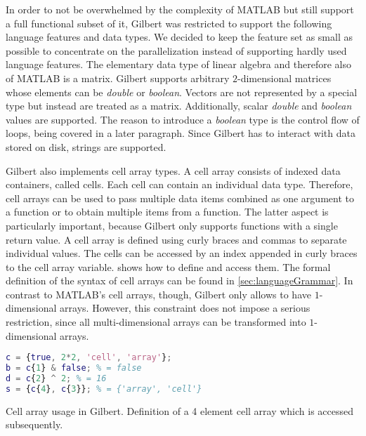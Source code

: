 In order to not be overwhelmed by the complexity of MATLAB but still support a full functional subset of it, Gilbert was restricted to support the following language features and data types.
We decided to keep the feature set as small as possible to concentrate on the parallelization instead of supporting hardly used language features.
The elementary data type of linear algebra and therefore also of MATLAB is a matrix.
Gilbert supports arbitrary $2$-dimensional matrices whose elements can be \emph{double} or \emph{boolean}.
Vectors are not represented by a special type but instead are treated as a matrix.
Additionally, scalar \emph{double} and \emph{boolean} values are supported.
The reason to introduce a \emph{boolean} type is the control flow of loops, being covered in a later paragraph.
Since Gilbert has to interact with data stored on disk, strings are supported.

Gilbert also implements cell array types.
A cell array consists of indexed data containers, called cells.
Each cell can contain an individual data type.
Therefore, cell arrays can be used to pass multiple data items combined as one argument to a function or to obtain multiple items from a function.
The latter aspect is particularly important, because Gilbert only supports functions with a single return value.
A cell array is defined using curly braces and commas to separate individual values.
The cells can be accessed by an index appended in curly braces to the cell array variable.
 shows how to define and access them.
The formal definition of the syntax of cell arrays can be found in \cref{sec:languageGrammar}.
In contrast to MATLAB's cell arrays, though, Gilbert only allows to have $1$-dimensional arrays.
However, this constraint does not impose a serious restriction, since all multi-dimensional arrays can be transformed into $1$-dimensional arrays. 

\begin{listing}[!h]
	\begin{CenteredBox}
		\begin{lstlisting}[language=Matlab,
  			commentstyle=\color{black},
  			stringstyle=\color{black},
		]
c = {true, 2*2, 'cell', 'array'};
b = c{1} & false; % = false
d = c{2} ^ 2; % = 16
s = {c{4}, c{3}}; % = {'array', 'cell'} 
		\end{lstlisting}
	\end{CenteredBox}
	\caption{Cell array usage in Gilbert. Definition of a 4 element cell array which is accessed subsequently.}
	\label{lst:cellArray}
\end{listing}

